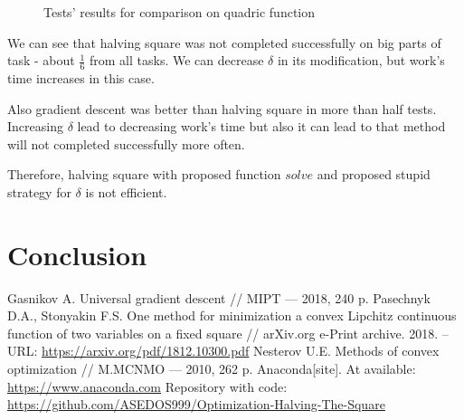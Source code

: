 \documentclass[12pt]{article}
\begin{document}
\begin{figure}[H]
\caption{Tests' results for comparison on quadric function}
\label{comp_pol}
\end{figure}

We can see that halving square was not completed successfully on big parts of task - about $\frac{1}{6}$ from all tasks. We can decrease $\delta$ in its modification, but work's time increases in this case.

Also gradient descent was better than halving square in more than half tests. Increasing $\delta$ lead to 
decreasing work's time but also it can lead to that method will not completed successfully more often.

Therefore, halving square with proposed function $solve$ and proposed stupid strategy for $\delta$ is not efficient.

\section{Conclusion}
\newpage
\begin{thebibliography}{3}
Gasnikov A.  Universal gradient descent // MIPT --- 2018, 240 p.
Pasechnyk D.A., Stonyakin F.S.  One method for minimization a convex Lipchitz continuous function of two variables on a fixed square // arXiv.org e-Print archive. 2018. – URL: \href{https://arxiv.org/pdf/1812.10300.pdf}{https://arxiv.org/pdf/1812.10300.pdf}
Nesterov U.E.  Methods of convex optimization // M.MCNMO --- 2010, 262 p.
Anaconda[site]. At available: \href{https://www.anaconda.com}{https://www.anaconda.com}
Repository with code: \href{https://github.com/ASEDOS999/Optimization-Halving-The-Square}{https://github.com/ASEDOS999/Optimization-Halving-The-Square}
\end{thebibliography}
\end{document}
